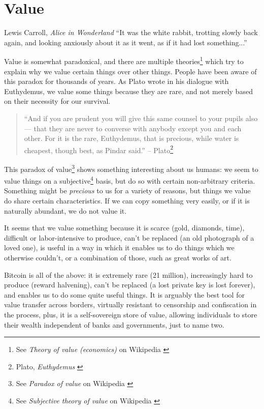 \chapter{Value}
\label{les:10}

\begin{chapquote}{Lewis Carroll, \textit{Alice in Wonderland}}
``It was the white rabbit, trotting slowly back again, and looking anxiously
about it as it went, as if it had lost something...''
\end{chapquote}

Value is somewhat paradoxical, and there are multiple theories\footnote{See
\textit{Theory of value (economics)} on Wikipedia \cite{wiki:theory-of-value}}
which try to explain why we value certain things over other things. People have
been aware of this paradox for thousands of years. As Plato wrote in his
dialogue with Euthydemus, we value some things because they are rare, and not
merely based on their necessity for our survival.

\begin{quotation}
``And if you are prudent you will give this same counsel to your pupils
also --- that they are never to converse with anybody except you and
each other. For it is the rare, Euthydemus, that is precious, while
water is cheapest, though best, as Pindar said.''
\flushright -- Plato\footnote{Plato, \textit{Euthydemus} \cite{euthydemus}}
\end{quotation}

This paradox of value\footnote{See \textit{Paradox of value} on Wikipedia
\cite{wiki:paradox-of-value}} shows something interesting about us humans: we
seem to value things on a subjective\footnote{See \textit{Subjective theory of value} on Wikipedia \cite{wiki:subjective-theory-of-value}} basis, but do so with certain
non-arbitrary criteria. Something might be \textit{precious} to us for a variety
of reasons, but things we value do share certain characteristics. If we can copy
something very easily, or if it is naturally abundant, we do not value it.

It seems that we value something because it is scarce (gold, diamonds,
time), difficult or labor-intensive to produce, can't be replaced (an
old photograph of a loved one), is useful in a way in which it enables
us to do things which we otherwise couldn't, or a combination of those,
such as great works of art.

Bitcoin is all of the above: it is extremely rare (21 million),
increasingly hard to produce (reward halvening), can't be replaced (a
lost private key is lost forever), and enables us to do some quite
useful things. It is arguably the best tool for value transfer across
borders, virtually resistant to censorship and confiscation in the
process, plus, it is a self-sovereign store of value, allowing
individuals to store their wealth independent of banks and governments,
just to name two.

